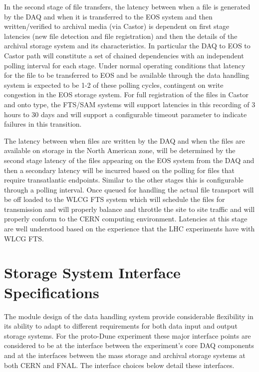 \documentclass[pdftex,12pt,letter]{article}
\begin{document}
In the second stage of file transfers, the latency between when a file is generated by the DAQ and when it is transferred to the EOS system and then written/verified to archival media (via Castor) is dependent on first stage latencies (new file detection and file registration) and then the details of the archival storage system and its characteristics.  In particular the DAQ to EOS to Castor path will constitute a set of chained dependencies with an independent polling interval for each stage.  Under normal operating conditions that latency for the file to be transferred to EOS and be available through the data handling system is expected to be 1-2 of these polling cycles, contingent on write congestion in the EOS storage system.   For full registration of the files in Castor and onto type, the FTS/SAM systems will support latencies in this recording of 3 hours to 30 days and will support a configurable timeout parameter to indicate failures in this transition.

The latency between when files are written by the DAQ and when the files are available on storage in the North American zone, will be determined by the second stage latency of the files appearing on the EOS system from the DAQ and then a secondary latency will be incurred based on the polling for files that require transatlantic endpoints.  Similar to the other stages this is configurable through a polling interval.  Once queued for handling the actual file transport will be off loaded to the WLCG FTS system which will schedule the files for transmission and will properly balance and throttle the site to site traffic and will properly conform to the CERN computing environment.  Latencies at this stage are well understood based on the experience that the LHC experiments have with WLCG FTS.  

\section{Storage System Interface Specifications}
The module design of the data handling system provide considerable flexibility in its ability to adapt to different requirements for both data input and output storage systems.  For the proto-Dune experiment these major interface points are considered to be at the interface between the experiment’s core DAQ components and at the interfaces between the mass storage and archival storage systems at both CERN and FNAL.  The interface choices below detail these interfaces.
\end{document}
